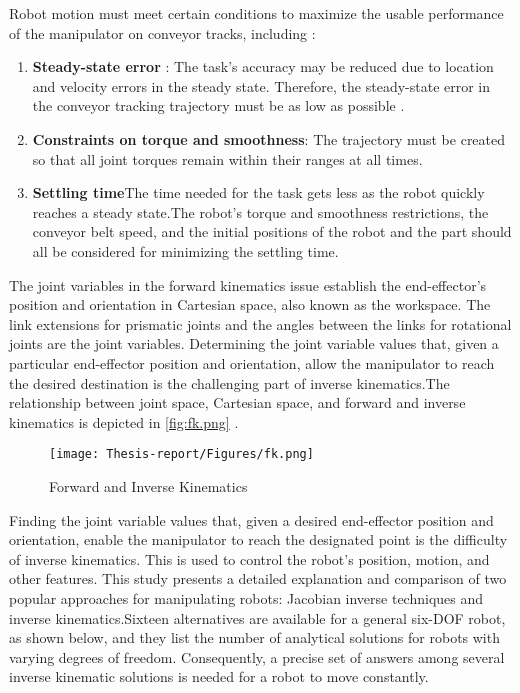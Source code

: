 \documentclass[12pt]{article}
\begin{document}
Robot motion must meet certain conditions to maximize the usable performance of the manipulator on conveyor tracks, including \cite{ref14}:
\begin{enumerate}
    \item \textbf{Steady-state error} : The task's accuracy may be reduced due to location and velocity errors in the steady state. Therefore, the steady-state error in the conveyor tracking trajectory must be as low as possible \cite{ref14}.
    \item \textbf{Constraints on torque and smoothness}: The trajectory must be created so that all joint torques remain within their ranges at all times\cite{ref14}.
    \item \textbf{Settling time}The time needed for the task gets less as the robot quickly reaches a steady state.The robot's torque and smoothness restrictions, the conveyor belt speed, and the initial positions of the robot and the part should all be considered for minimizing the settling time\cite{ref14}.
\end{enumerate}
The joint variables in the forward kinematics issue establish the end-effector's position and orientation in Cartesian space, also known as the workspace. The link extensions for prismatic joints and the angles between the links for rotational joints are the joint variables. Determining the joint variable values that, given a particular end-effector position and orientation, allow the manipulator to reach the desired destination is the challenging part of inverse kinematics.The relationship between joint space, Cartesian space, and forward and inverse kinematics is depicted in \autoref{fig:fk.png} \cite{ref10}.\\

\begin{figure}[h]
    \centering
    \texttt{[image: Thesis-report/Figures/fk.png]}  
    \caption{Forward and Inverse Kinematics \cite{ref10}}
    \label{fig:fk.png}
\end{figure}

Finding the joint variable values that, given a desired end-effector position and orientation, enable the manipulator to reach the designated point is the difficulty of inverse kinematics. This is used to control the robot's position, motion, and other features. This study presents a detailed explanation and comparison of two popular approaches for manipulating robots: Jacobian inverse techniques and inverse kinematics.Sixteen alternatives are available for a general six-DOF robot, as shown below, and they list the number of analytical solutions for robots with varying degrees of freedom. Consequently, a precise set of answers among several inverse kinematic solutions is needed for a robot to move constantly\cite{ref10}.\\
\end{document}
